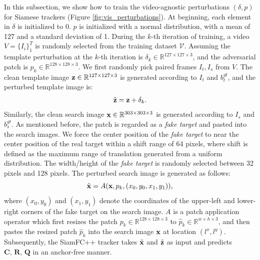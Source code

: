 \documentclass[journal]{IEEEtran}
\begin{document}
In this subsection, we show how to train the video-agnostic perturbations $(\delta, p)$ for Siamese trackers (Figure \ref{fig:vis_perturbations}). At beginning, each element in $\delta$ is initialized to 0. $p$ is initialized with a normal distribution, with a mean of 127 and a standard deviation of 1. During the $k$-th iteration of training, a video $V=\{I_i\}_1^T$ is randomly selected from the training dataset $\mathcal V$. Assuming the template perturbation at the $k$-th iteration is $\delta_k \in \mathbb{R}^{127\times 127 \times 3}$, and the adversarial patch is $p_k \in \mathbb{R}^{128\times 128\times 3}$. We first randomly pick paired frames $I_t, I_s$ from $V$. The clean template image $\textbf z\in \mathbb{R}^{127\times 127 \times 3}$ is generated according to $I_t$ and $b^{gt}_t$, and the perturbed template image is:
\begin{equation}
\tilde {\textbf z} = \textbf z + \delta_k.
\end{equation}
Similarly, the clean search image $\textbf x \in \mathbb{R}^{303\times 303 \times 3}$ is generated according to $I_s$ and $b^{gt}_s$.
As mentioned before, the patch is regarded as a \textit{fake target} and pasted into the search images. We force the center position of the \textit{fake target} to near the center position of the real target within a shift range of 64 pixels, where shift is defined as the maximum range of translation generated from a uniform distribution.
The width/height of the \textit{fake target} is randomly selected between 32 pixels and 128 pixels.
The perturbed search image is generated as follows:
\begin{equation}
\tilde{\textbf x} = A(\textbf x, p_k, (x_0, y_0, x_1, y_1)),
\end{equation}
where $(x_0, y_0)$ and $(x_1, y_1)$ denote the coordinates of the upper-left and lower-right corners of the fake target on the search image. $A$ is a patch application operator \cite{patch} which first resizes the patch $p_k \in \mathbb{R}^{128\times 128\times 3}$ to $\hat{p}_k \in \mathbb{R}^{w\times h\times 3}$, and then pastes the resized patch $\hat{p}_k$ into the search image $\textbf x$ at location $(l^x,l^y)$. Subsequently, the SiamFC++ tracker takes $\tilde {\textbf x}$ and $\tilde{\textbf  z}$ as input and predicts $\textbf{C, R, Q}$ in an anchor-free manner.
\end{document}
